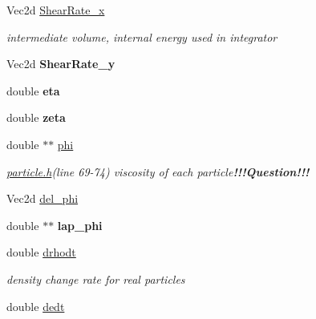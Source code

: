 \begin{CompactItemize}
\item 
\hypertarget{classParticle_7a60f30c44da2e6cfb2c17d3199d65f2}{
Vec2d \hyperlink{classParticle_7a60f30c44da2e6cfb2c17d3199d65f2}{ShearRate\_\-x}}
\label{classParticle_7a60f30c44da2e6cfb2c17d3199d65f2}

\begin{CompactList}\small\item\em intermediate volume, internal energy used in integrator \item\end{CompactList}\item 
\hypertarget{classParticle_02f0b4442dc26c724d3bca383f542683}{
Vec2d \textbf{ShearRate\_\-y}}
\label{classParticle_02f0b4442dc26c724d3bca383f542683}

\item 
\hypertarget{classParticle_2d0c5ad7aa3ed6f2a18822020cfc5fa4}{
double \textbf{eta}}
\label{classParticle_2d0c5ad7aa3ed6f2a18822020cfc5fa4}

\item 
\hypertarget{classParticle_5d070e879a5fd02b62f822c5a21c1747}{
double \textbf{zeta}}
\label{classParticle_5d070e879a5fd02b62f822c5a21c1747}

\item 
\hypertarget{classParticle_acc4d2cb20aafcb510b648e8f0ccadac}{
double $\ast$$\ast$ \hyperlink{classParticle_acc4d2cb20aafcb510b648e8f0ccadac}{phi}}
\label{classParticle_acc4d2cb20aafcb510b648e8f0ccadac}

\begin{CompactList}\small\item\em \hyperlink{particle_8h_source}{particle.h}(line 69-74) viscosity of each particle{\bf !!!Question!!!} \item\end{CompactList}\item 
Vec2d \hyperlink{classParticle_0461d98d796ba0e2dc72edb5b2fb093a}{del\_\-phi}
\item 
\hypertarget{classParticle_5b6d8725dbd06dfeb73692f6a91776db}{
double $\ast$$\ast$ \textbf{lap\_\-phi}}
\label{classParticle_5b6d8725dbd06dfeb73692f6a91776db}

\item 
\hypertarget{classParticle_b8ed5fa9fede49e38ef74e955e1179ee}{
double \hyperlink{classParticle_b8ed5fa9fede49e38ef74e955e1179ee}{drhodt}}
\label{classParticle_b8ed5fa9fede49e38ef74e955e1179ee}

\begin{CompactList}\small\item\em density change rate for real particles \item\end{CompactList}\item 
\hypertarget{classParticle_114e4e1b158cff18b44a881981cba71a}{
double \hyperlink{classParticle_114e4e1b158cff18b44a881981cba71a}{dedt}}
\label{classParticle_114e4e1b158cff18b44a881981cba71a}


\end{CompactItemize}
